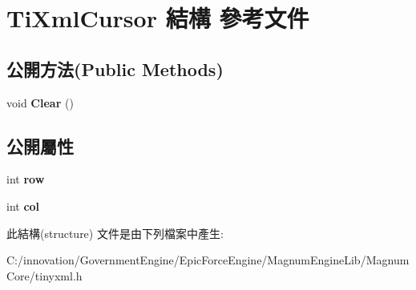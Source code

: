 \hypertarget{struct_ti_xml_cursor}{}\section{Ti\+Xml\+Cursor 結構 參考文件}
\label{struct_ti_xml_cursor}
\subsection*{公開方法(Public Methods)}
\begin{DoxyCompactItemize}
\item 
void {\bfseries Clear} ()\hypertarget{struct_ti_xml_cursor_a1e6fa622b59dafb71b6efe595105dcdd}{}\label{struct_ti_xml_cursor_a1e6fa622b59dafb71b6efe595105dcdd}

\end{DoxyCompactItemize}
\subsection*{公開屬性}
\begin{DoxyCompactItemize}
\item 
int {\bfseries row}\hypertarget{struct_ti_xml_cursor_a5b54dd949820c2db061e2be41f3effb3}{}\label{struct_ti_xml_cursor_a5b54dd949820c2db061e2be41f3effb3}

\item 
int {\bfseries col}\hypertarget{struct_ti_xml_cursor_a5694d7ed2c4d20109d350c14c417969d}{}\label{struct_ti_xml_cursor_a5694d7ed2c4d20109d350c14c417969d}

\end{DoxyCompactItemize}


此結構(structure) 文件是由下列檔案中產生\+:\begin{DoxyCompactItemize}
\item 
C\+:/innovation/\+Government\+Engine/\+Epic\+Force\+Engine/\+Magnum\+Engine\+Lib/\+Magnum\+Core/tinyxml.\+h\end{DoxyCompactItemize}
